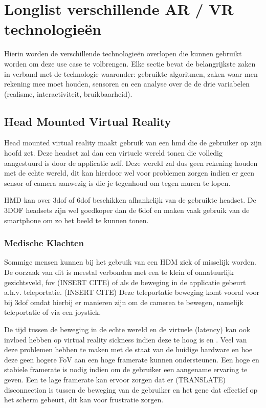 \chapter{Longlist verschillende AR / VR technologieën}
\label{ch:longlist}

Hierin worden de verschillende technologieën overlopen die kunnen gebruikt worden om deze use case te volbrengen.
Elke sectie bevat de belangrijkste zaken in verband met de technologie waaronder: gebruikte algoritmen, zaken waar men rekening mee moet houden, sensoren en een analyse over de de drie variabelen (realisme, interactiviteit, bruikbaarheid).

\section{Head Mounted Virtual Reality}
Head mounted virtual reality maakt gebruik van een \acrshort{hmd} die de gebruiker op zijn hoofd zet. Deze headset zal dan een virtuele wereld tonen die volledig aangestuurd is door de applicatie zelf. Deze wereld zal dus geen rekening houden met de echte wereld, dit kan hierdoor wel voor problemen zorgen indien er geen sensor of camera aanwezig is die je tegenhoud om tegen muren te lopen.

HMD kan over \acrshort{3dof} of \acrshort{6dof} beschikken afhankelijk van de gebruikte headset. De 3DOF headsets zijn wel goedkoper dan de \acrshort{6dof} en maken vaak gebruik van de smartphone om zo het beeld te kunnen tonen. 
\subsection{Medische Klachten}
Sommige mensen kunnen bij het gebruik van een HDM ziek of misselijk worden. De oorzaak van dit is meestal verbonden met een te klein of onnatuurlijk gezichtsveld, \acrfull{fov} (INSERT CITE) of als de beweging in de applicatie gebeurt a.h.v. teleportatie. (INSERT CITE) Deze teleportatie beweging komt vooral voor bij \acrshort{3dof} omdat hierbij er manieren zijn om de camerea te bewegen, namelijk teleportatie of via een joystick.

De tijd tussen de beweging in de echte wereld en de virtuele (latency) kan ook invloed hebben op virtual reality sickness indien deze te hoog is \autocite{Elbamby2018} en \autocite{DiZio2000}. 
Veel van deze problemen hebben te maken met de staat van de huidige hardware en hoe deze geen hogere FoV aan een hoge framerate kunnen ondersteunen. Een hoge en stabiele framerate is nodig indien om de gebruiker een aangename ervaring te geven. Een te lage framerate kan ervoor zorgen dat er (TRANSLATE) disconnection is tussen de beweging van de gebruiker en het gene dat effectief op het scherm gebeurt, dit kan voor frustratie zorgen.
